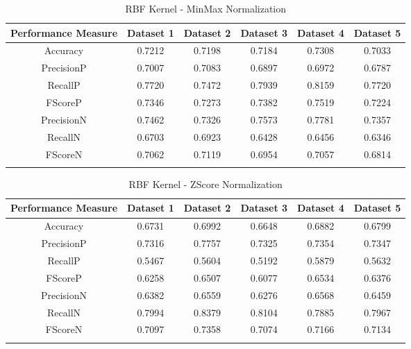 \begin{center}
\begin{longtable}{| c | c | c | c | c | c |}      
    \hline
    Performance Measure & Dataset 1 & Dataset 2 & Dataset 3 & Dataset 4 & Dataset 5 \\ \hline
    Accuracy & 0.7212 & 0.7198 & 0.7184 & 0.7308 & 0.7033  \\ \hline
    PrecisionP & 0.7007 & 0.7083 & 0.6897 & 0.6972 & 0.6787  \\ \hline
    RecallP & 0.7720 & 0.7472 & 0.7939 & 0.8159 & 0.7720  \\ \hline
    FScoreP & 0.7346 & 0.7273 & 0.7382 & 0.7519 & 0.7224  \\ \hline %
    PrecisionN & 0.7462 & 0.7326 & 0.7573 & 0.7781 & 0.7357  \\ \hline
    RecallN & 0.6703 & 0.6923 & 0.6428 & 0.6456 & 0.6346  \\ \hline
    FScoreN & 0.7062 & 0.7119 & 0.6954 & 0.7057 & 0.6814  \\ \hline %
    \caption{RBF Kernel - MinMax Normalization}
  \label{tab:RBFKernelMinMaxNormalization}
\end{longtable}
\end{center}


\begin{center}
\begin{longtable}{| c | c | c | c | c | c |}      
    \hline
    Performance Measure & Dataset 1 & Dataset 2 & Dataset 3 & Dataset 4 & Dataset 5 \\ \hline
    Accuracy & 0.6731 & 0.6992 & 0.6648 & 0.6882 & 0.6799  \\ \hline 
    PrecisionP & 0.7316 & 0.7757 & 0.7325 & 0.7354 & 0.7347  \\ \hline
    RecallP & 0.5467 & 0.5604 & 0.5192 & 0.5879 & 0.5632  \\ \hline
    FScoreP & 0.6258 & 0.6507 & 0.6077 & 0.6534 & 0.6376  \\ \hline %
    PrecisionN & 0.6382 & 0.6559 & 0.6276 & 0.6568 & 0.6459  \\ \hline
    RecallN & 0.7994 & 0.8379 & 0.8104 & 0.7885 & 0.7967  \\ \hline
    FScoreN & 0.7097 & 0.7358 & 0.7074 & 0.7166 & 0.7134  \\ \hline %
    \caption{RBF Kernel - ZScore Normalization}
  \label{tab:RBFKernelZScoreNormalization}
\end{longtable}
\end{center}

